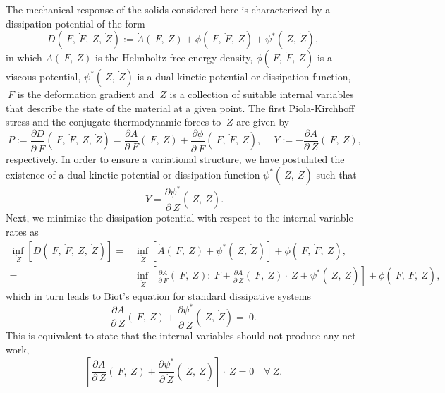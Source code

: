 \documentclass[12pt]{article}
\numberwithin{equation}{section}
\begin{document}
The mechanical response of the solids considered here is characterized
by a dissipation potential of the form
\begin{equation} \label{eq:power-density}
  D(~F, \dot{~F}, ~Z, \dot{~Z})
  :=
  \dot{A}(~F, ~Z)
  +
  \phi(~F, \dot{~F}, ~Z)
  +
  \psi^*(~Z, \dot{~Z}),
\end{equation}
in which $A(~F, ~Z)$ is the Helmholtz free-energy density,
$\phi(~F, \dot{~F}, ~Z)$ is a viscous potential, $\psi^*(~Z,
\dot{~Z})$ is a dual kinetic potential or dissipation function, $~F$
is the deformation gradient and $~Z$ is a collection of suitable
internal variables that describe the state of the material at a given
point. The first Piola-Kirchhoff stress and the conjugate
thermodynamic forces to $~Z$ are given by
\begin{equation} \label{eq:1PKstress-and-Y}
  ~P
  :=
  \frac{\partial D}{\partial \dot{~F}}(~F, \dot{~F}, ~Z, \dot{~Z})
  =
  \frac{\partial A}{\partial ~F}(~F, ~Z)
  +
  \frac{\partial \phi}{\partial \dot{~F}}(~F, \dot{~F}, ~Z),
  \quad
  ~Y := - \frac{\partial A}{\partial ~Z} (~F, ~Z),
\end{equation}
respectively. In order to ensure a variational structure, we have
postulated the existence of a dual kinetic potential or dissipation
function $\psi^*(~Z, \dot{~Z})$ such that
\begin{equation} \label{eq:dual-kinetic-potential}
  ~Y = \frac{\partial \psi^*}{\partial \dot{~Z}} (~Z, \dot{~Z}).
\end{equation}
Next, we minimize the dissipation potential 
with respect to the internal variable rates as
\begin{equation}
  \begin{split}
    \inf_{\dot{~Z}} [ D(~F, \dot{~F}, ~Z, \dot{~Z}) ]
    =
    &
    \inf_{\dot{~Z}}
    \left[
      \dot{A}(~F, ~Z)
      +
      \psi^*(~Z, \dot{~Z})
    \right] +
    \phi(~F, \dot{~F}, ~Z),
    \\
    =
    &
    \inf_{\dot{~Z}}
    \left[
      \frac{\partial A}{\partial ~F}(~F, ~Z) : \dot{~F}
      +
      \frac{\partial A}{\partial ~Z}(~F, ~Z) \cdot \dot{~Z}
      +
      \psi^*(~Z, \dot{~Z})
    \right] +
    \phi(~F, \dot{~F}, ~Z),
  \end{split}
\end{equation}
which in turn leads to Biot's equation for standard dissipative systems
\begin{equation} \label{eq:Biots-equation}
  \frac{\partial A}{\partial ~Z} (~F, ~Z)
  +
  \frac{\partial \psi^*}{\partial \dot{~Z}} (~Z, \dot{~Z})
  =
  ~0.
\end{equation}
This is equivalent to state that the internal variables should not
produce any net work, \ie
\begin{equation} \label{eq:internal-no-work}
  \left[
    \frac{\partial A}{\partial ~Z} (~F, ~Z)
    +
    \frac{\partial \psi^*}{\partial \dot{~Z}} (~Z, \dot{~Z})
  \right]
  \cdot
   \dot{~Z}
  =
  0
  \quad
  \forall \dot{~Z}.
\end{equation}
\end{document}

